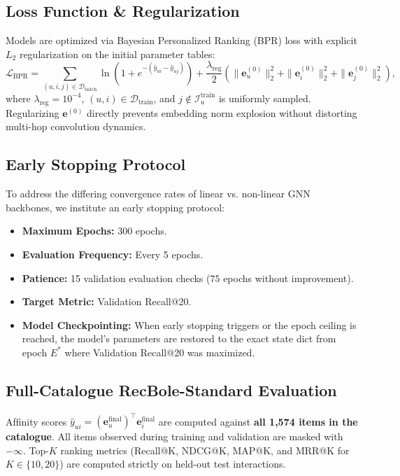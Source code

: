 \documentclass[11pt,a4paper]{article}
\begin{document}
\subsection{Loss Function \& Regularization}
Models are optimized via Bayesian Personalized Ranking (BPR) loss with explicit $L_2$ regularization on the initial parameter tables:
\begin{equation}
    \mathcal{L}_{\text{BPR}} = \sum_{(u, i, j) \in \mathcal{D}_{\text{batch}}} \ln\left(1 + e^{-(\hat{y}_{ui} - \hat{y}_{uj})}\right) + \frac{\lambda_{\text{reg}}}{2} \left(\|\mathbf{e}_u^{(0)}\|_2^2 + \|\mathbf{e}_i^{(0)}\|_2^2 + \|\mathbf{e}_j^{(0)}\|_2^2\right),
\end{equation}
where $\lambda_{\text{reg}} = 10^{-4}$, $(u, i) \in \mathcal{D}_{\text{train}}$, and $j \notin \mathcal{I}_u^{\text{train}}$ is uniformly sampled. Regularizing $\mathbf{e}^{(0)}$ directly prevents embedding norm explosion without distorting multi-hop convolution dynamics.

\subsection{Early Stopping Protocol}
To address the differing convergence rates of linear vs. non-linear GNN backbones, we institute an early stopping protocol:
\begin{itemize}
    \item \textbf{Maximum Epochs:} 300 epochs.
    \item \textbf{Evaluation Frequency:} Every 5 epochs.
    \item \textbf{Patience:} 15 validation evaluation checks ($75$ epochs without improvement).
    \item \textbf{Target Metric:} Validation Recall@20.
    \item \textbf{Model Checkpointing:} When early stopping triggers or the epoch ceiling is reached, the model's parameters are restored to the exact state dict from epoch $E^*$ where Validation Recall@20 was maximized.
\end{itemize}

\subsection{Full-Catalogue RecBole-Standard Evaluation}
Afﬁnity scores $\hat{y}_{ui} = (\mathbf{e}_u^{\text{final}})^\top \mathbf{e}_i^{\text{final}}$ are computed against \textbf{all 1,574 items in the catalogue}. All items observed during training and validation are masked with $-\infty$. Top-$K$ ranking metrics (Recall@K, NDCG@K, MAP@K, and MRR@K for $K \in \{10, 20\}$) are computed strictly on held-out test interactions.
\end{document}
